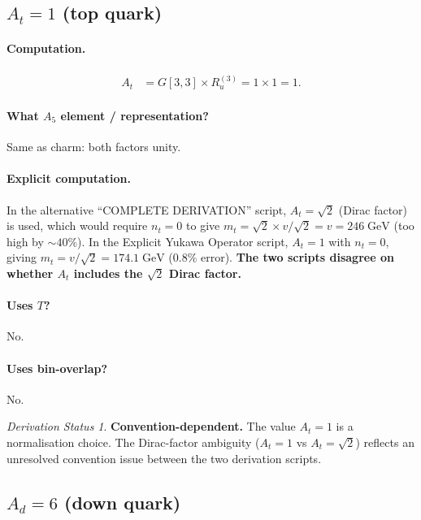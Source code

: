 \documentclass[11pt]{article}
\theoremstyle{remark}
\newtheorem*{status}{Derivation Status}
\begin{document}
\subsection{$A_t = 1$ \quad (top quark)}

\paragraph{Computation.}
\begin{align}
A_t &= G[3,3] \times R_u^{(3)} = 1 \times 1 = 1.
\end{align}

\paragraph{What $A_5$ element / representation?}
Same as charm: both factors unity.

\paragraph{Explicit computation.}
In the alternative ``COMPLETE DERIVATION'' script, $A_t = \sqrt{2}$ (Dirac factor) is used, which would require $n_t = 0$ to give $m_t = \sqrt{2} \times v/\sqrt{2} = v = 246\;\mathrm{GeV}$ (too high by $\sim 40\%$).
In the Explicit Yukawa Operator script, $A_t = 1$ with $n_t = 0$, giving $m_t = v/\sqrt{2} = 174.1\;\mathrm{GeV}$ (0.8\% error).
\textbf{The two scripts disagree on whether $A_t$ includes the $\sqrt{2}$ Dirac factor.}

\paragraph{Uses $T$?} No.
\paragraph{Uses bin-overlap?} No.

\begin{status}
\textbf{Convention-dependent.}
The value $A_t = 1$ is a normalisation choice.
The Dirac-factor ambiguity ($A_t = 1$ vs $A_t = \sqrt{2}$) reflects an unresolved convention issue between the two derivation scripts.
\end{status}

\subsection{$A_d = 6$ \quad (down quark)}
\end{document}
